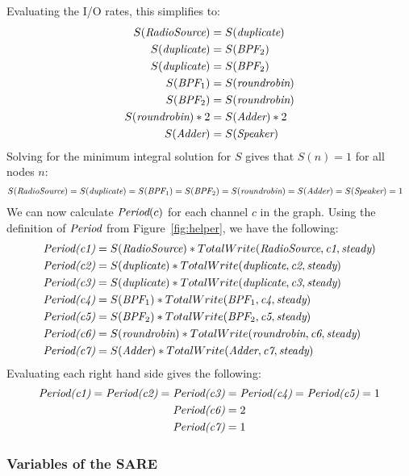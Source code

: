 Evaluating the I/O rates, this simplifies to:
\begin{align*}
S(\mbox{\it RadioSource}) &= S(\mbox{\it duplicate}) \\
S(\mbox{\it duplicate})  &= S(\mbox{\it BPF}_2) \\
S(\mbox{\it duplicate})  &= S(\mbox{\it BPF}_2) \\
S(\mbox{\it BPF}_1) &= S(\mbox{\it roundrobin}) \\
S(\mbox{\it BPF}_2) &= S(\mbox{\it roundrobin}) \\
S(\mbox{\it roundrobin}) * 2 &= S(\mbox{\it Adder}) * 2 \\
S(\mbox{\it Adder}) &= S(\mbox{\it Speaker})
\end{align*}
Solving for the minimum integral solution for $S$ gives that $S(n) = 1$ for all nodes $n$:
\begin{align*}
S(\mbox{\it RadioSource}) &= S(\mbox{\it duplicate}) = S(\mbox{\it BPF}_1) = S(\mbox{\it BPF}_2) = S(\mbox{\it roundrobin}) = S(\mbox{\it Adder}) = S(\mbox{\it Speaker}) = 1
\end{align*}
We can now calculate $\mbox{\it Period}(c)$ for each channel $c$ in the
graph.  Using the definition of $\mbox{\it Period}$ from
Figure~\ref{fig:helper}, we have the following:
\begin{align*}
\mbox{\it Period(c1)} &= S(\mbox{\it RadioSource}) * TotalWrite(\mbox{\it RadioSource}, \mbox{\it c1}, \mbox{\it steady}) \\
\mbox{\it Period(c2)} &= S(\mbox{\it duplicate}) * TotalWrite(\mbox{\it duplicate}, \mbox{\it c2}, \mbox{\it steady}) \\
\mbox{\it Period(c3)} &= S(\mbox{\it duplicate}) * TotalWrite(\mbox{\it duplicate}, \mbox{\it c3}, \mbox{\it steady}) \\
\mbox{\it Period(c4)} &= S(\mbox{\it BPF}_1) * TotalWrite(\mbox{\it BPF}_1, \mbox{\it c4}, \mbox{\it steady}) \\
\mbox{\it Period(c5)} &= S(\mbox{\it BPF}_2) * TotalWrite(\mbox{\it BPF}_2, \mbox{\it c5}, \mbox{\it steady}) \\
\mbox{\it Period(c6)} &= S(\mbox{\it roundrobin}) * TotalWrite(\mbox{\it roundrobin}, \mbox{\it c6}, \mbox{\it steady}) \\
\mbox{\it Period(c7)} &= S(\mbox{\it Adder}) * TotalWrite(\mbox{\it Adder}, \mbox{\it c7}, \mbox{\it steady})
\end{align*}
Evaluating each right hand side gives the following:
\begin{align*}
\mbox{\it Period(c1)} = \mbox{\it Period(c2)} = \mbox{\it Period(c3)} &= \mbox{\it Period(c4)} = \mbox{\it Period(c5)} = 1 \\
\mbox{\it Period(c6)} &= 2 \\
\mbox{\it Period(c7)} &= 1 
\end{align*}

\subsubsection{Variables of the SARE}

